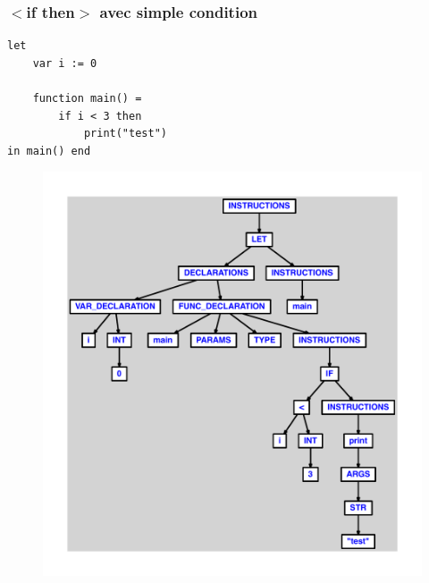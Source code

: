 \documentclass{article}
\begin{document}
\subsubsection{$ < $if then$ > $ avec simple condition}
\begin{lstlisting}
let
	var i := 0

	function main() =
		if i < 3 then
			print("test")
in main() end
\end{lstlisting}
\newpage
\begin{figure}[H]
\centering
\includegraphics[max width=\textwidth]{ast/ast_260.pdf}
\end{figure}
\newpage
\end{document}
